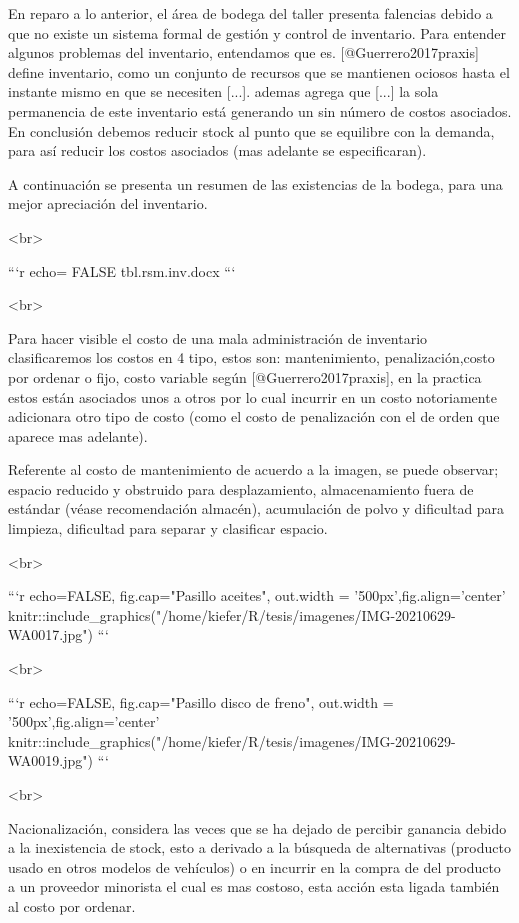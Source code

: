 \documentclass{article}\usepackage[]{graphicx}\usepackage[]{xcolor}
\begin{document}
En reparo a lo anterior, el área de bodega del taller presenta falencias debido a que no existe un sistema formal de gestión y control de inventario. Para entender algunos problemas del inventario, entendamos que es. [@Guerrero2017praxis] define inventario, como un conjunto de recursos que se mantienen ociosos hasta el instante mismo en que se necesiten [...]. ademas agrega que [...] la sola permanencia de este inventario está generando un sin número de costos asociados. En conclusión debemos reducir stock al punto que se equilibre con la demanda, para así reducir los costos asociados (mas adelante se especificaran).

A continuación se presenta un resumen de las existencias de la bodega, para una mejor apreciación del inventario.

<br>

```{r echo= FALSE}
tbl.rsm.inv.docx
```

<br>

Para hacer visible el costo de una mala administración de inventario clasificaremos los costos en 4 tipo, estos son: mantenimiento, penalización,costo por ordenar o fijo, costo variable según [@Guerrero2017praxis], en la practica estos están asociados unos a otros por lo cual incurrir en un costo notoriamente adicionara otro tipo de costo (como el costo de penalización con el de orden que aparece mas adelante).

Referente al costo de mantenimiento de acuerdo a la imagen, se puede observar; espacio reducido y obstruido para desplazamiento, almacenamiento fuera de estándar (véase recomendación almacén), acumulación de polvo y dificultad para limpieza, dificultad para separar y clasificar espacio.

<br>

```{r echo=FALSE, fig.cap="Pasillo aceites", out.width = '500px',fig.align='center'}
knitr::include_graphics("/home/kiefer/R/tesis/imagenes/IMG-20210629-WA0017.jpg")
```

<br>

```{r echo=FALSE, fig.cap="Pasillo disco de freno", out.width = '500px',fig.align='center'}
knitr::include_graphics("/home/kiefer/R/tesis/imagenes/IMG-20210629-WA0019.jpg")
```

<br>

Nacionalización, considera las veces que se ha dejado de percibir ganancia debido a la inexistencia de stock, esto a derivado a la búsqueda de alternativas (producto usado en otros modelos de vehículos) o en incurrir en la compra de del producto a un proveedor minorista el cual es mas costoso, esta acción esta ligada también al costo por ordenar.
\end{document}
